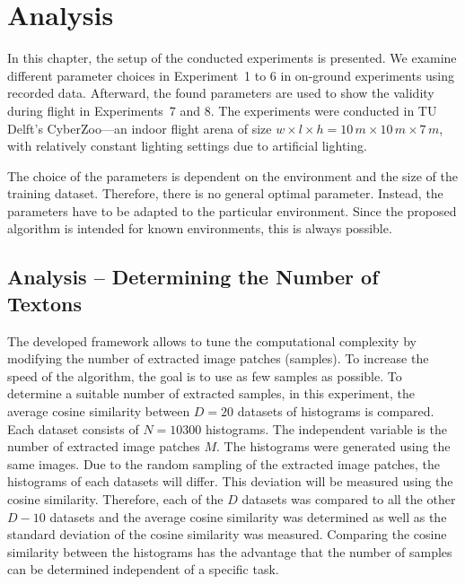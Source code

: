 \chapter{Analysis}
\label{chap:analysis}

In this chapter, the setup of the conducted experiments is
presented. We examine different parameter choices in Experiment~1 to 6
in on-ground experiments using recorded data. Afterward, the found
parameters are used to show the validity during flight in
Experiments~7 and 8. The experiments were conducted in TU Delft's
CyberZoo---an indoor flight arena of size $w \times l \times h = 10\,m
\times10\,m \times 7\,m$, with relatively constant lighting settings
due to artificial lighting.

The choice of the parameters is dependent on the environment and the size of the training dataset. Therefore, there is no general optimal parameter. Instead, the parameters have to be adapted to the particular environment. Since the proposed algorithm is intended for known environments, this is always possible.

\section{Analysis -- Determining the Number of Textons}
\label{sec:numtextons}

The developed framework allows to tune the computational complexity by
modifying the number of extracted image patches (samples). To increase
the speed of the algorithm, the goal is to use as few samples as
possible. To determine a suitable number of extracted samples, in this
experiment, the average cosine similarity between $D = 20$ datasets of
histograms is compared. Each dataset consists of $N = 10300$
histograms. The independent variable is the number of extracted image
patches $M$. The histograms were generated using the same images. Due
to the random sampling of the extracted image patches, the histograms
of each datasets will differ. This deviation will be measured using
the cosine similarity. Therefore, each of the $D$ datasets was
compared to all the other $D - 10$ datasets and the average cosine
similarity was determined as well as the standard deviation of the
cosine similarity was measured. Comparing the cosine similarity
between the histograms has the advantage that the number of samples
can be determined independent of a specific task.